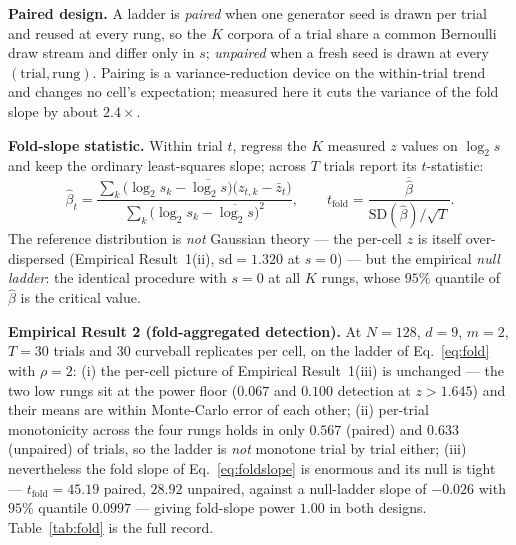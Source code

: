 \documentclass[11pt,a4paper]{article}
\theoremstyle{plain}
\theoremstyle{remark}
\theoremstyle{plain}
\begin{document}
\textbf{Paired design.} A ladder is \emph{paired} when one generator seed is drawn per trial and reused at every rung, so the $K$ corpora of a trial share a common Bernoulli draw stream and differ only in $s$; \emph{unpaired} when a fresh seed is drawn at every $(\text{trial},\text{rung})$. Pairing is a variance-reduction device on the within-trial trend and changes no cell's expectation; measured here it cuts the variance of the fold slope by about $2.4\times$.

\textbf{Fold-slope statistic.} Within trial $t$, regress the $K$ measured $z$ values on $\log_2 s$ and keep the ordinary least-squares slope; across $T$ trials report its $t$-statistic:
\begin{equation}
\hat\beta_t=\frac{\sum_k\big(\log_2 s_k-\overline{\log_2 s}\big)\big(z_{t,k}-\bar z_t\big)}{\sum_k\big(\log_2 s_k-\overline{\log_2 s}\big)^2},
\qquad
t_{\mathrm{fold}}=\frac{\overline{\hat\beta}}{\mathrm{SD}(\hat\beta)/\sqrt{T}} .
\label{eq:foldslope}
\end{equation}
The reference distribution is \emph{not} Gaussian theory --- the per-cell $z$ is itself over-dispersed (Empirical Result~1(ii), $\mathrm{sd}=1.320$ at $s=0$) --- but the empirical \emph{null ladder}: the identical procedure with $s=0$ at all $K$ rungs, whose $95\%$ quantile of $\hat\beta$ is the critical value.

\textbf{Empirical Result 2 (fold-aggregated detection).}
\label{thm:fold}
At $N=128$, $d=9$, $m=2$, $T=30$ trials and $30$ curveball replicates per cell, on the ladder of Eq.~\eqref{eq:fold} with $\rho=2$: (i) the per-cell picture of Empirical Result~1(iii) is unchanged --- the two low rungs sit at the power floor ($0.067$ and $0.100$ detection at $z>1.645$) and their means are within Monte-Carlo error of each other; (ii) per-trial monotonicity across the four rungs holds in only $0.567$ (paired) and $0.633$ (unpaired) of trials, so the ladder is \emph{not} monotone trial by trial either; (iii) nevertheless the fold slope of Eq.~\eqref{eq:foldslope} is enormous and its null is tight --- $t_{\mathrm{fold}}=45.19$ paired, $28.92$ unpaired, against a null-ladder slope of $-0.026$ with $95\%$ quantile $0.0997$ --- giving fold-slope power $1.00$ in both designs. Table~\ref{tab:fold} is the full record.
\end{document}

